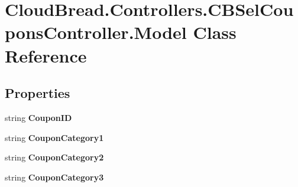 \hypertarget{class_cloud_bread_1_1_controllers_1_1_c_b_sel_coupons_controller_1_1_model}{}\section{Cloud\+Bread.\+Controllers.\+C\+B\+Sel\+Coupons\+Controller.\+Model Class Reference}
\label{class_cloud_bread_1_1_controllers_1_1_c_b_sel_coupons_controller_1_1_model}
\subsection*{Properties}
\begin{DoxyCompactItemize}
\item 
string {\bfseries Coupon\+ID}\hypertarget{class_cloud_bread_1_1_controllers_1_1_c_b_sel_coupons_controller_1_1_model_a82fb8bf3605abfebd4f4ca3cea8ce7bf}{}\label{class_cloud_bread_1_1_controllers_1_1_c_b_sel_coupons_controller_1_1_model_a82fb8bf3605abfebd4f4ca3cea8ce7bf}

\item 
string {\bfseries Coupon\+Category1}\hypertarget{class_cloud_bread_1_1_controllers_1_1_c_b_sel_coupons_controller_1_1_model_aae5b24c6ff0a6635e7ea421a5bd4282a}{}\label{class_cloud_bread_1_1_controllers_1_1_c_b_sel_coupons_controller_1_1_model_aae5b24c6ff0a6635e7ea421a5bd4282a}

\item 
string {\bfseries Coupon\+Category2}\hypertarget{class_cloud_bread_1_1_controllers_1_1_c_b_sel_coupons_controller_1_1_model_ad9c48e8fce23281c98feb6bc0d4cba92}{}\label{class_cloud_bread_1_1_controllers_1_1_c_b_sel_coupons_controller_1_1_model_ad9c48e8fce23281c98feb6bc0d4cba92}

\item 
string {\bfseries Coupon\+Category3}\hypertarget{class_cloud_bread_1_1_controllers_1_1_c_b_sel_coupons_controller_1_1_model_a02a023a0436b1e5fb4d3b30ab3dbb132}{}\label{class_cloud_bread_1_1_controllers_1_1_c_b_sel_coupons_controller_1_1_model_a02a023a0436b1e5fb4d3b30ab3dbb132}


\end{DoxyCompactItemize}
